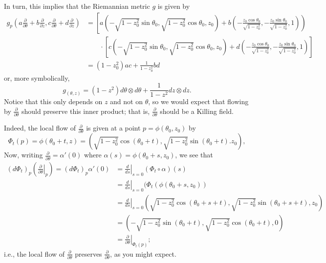 \begin{example}
	In turn, this implies that the Riemannian metric $g$ is given by
	\begin{align*}
		g_p\left(a \frac{\partial}{\partial \theta} + b \frac{\partial}{\partial z}, c \frac{\partial}{\partial \theta} + d \frac{\partial}{\partial z}\right) & = \left[a\left(-\sqrt{1-z_0^2}\sin\theta_0, \sqrt{1-z_0^2}\cos \theta_0,z_0\right)+ b\left(-\frac{z_0 \cos \theta_0}{\sqrt{1-z_0^2}},-\frac{z_0 \sin \theta_0}{\sqrt{1-z_0^2}},1\right)\right) \\
		& \qquad \cdot \left[c\left(-\sqrt{1-z_0^2}\sin\theta_0, \sqrt{1-z_0^2}\cos \theta_0,z_0\right)+ d\left(-\frac{z_0 \cos \theta_0}{\sqrt{1-z_0^2}},-\frac{z_0 \sin \theta_0}{\sqrt{1-z_0^2}},1\right)\right]  \\
		& = \left(1-z_0^2\right) ac + \frac{1}{1-z_0^2} bd
	\end{align*}
	or, more symbolically,
	\[
		g_{(\theta,z)} = \left(1-z^2\right) d\theta \otimes d\theta + \frac{1}{1-z^2} dz \otimes dz.
	\]
	Notice that this only depends on $z$ and not on $\theta$, so we would expect that flowing by $\frac{\partial}{\partial \theta}$ should preserve this inner product; that is, $\frac{\partial}{\partial \theta}$ should be a Killing field. 
	
	Indeed, the local flow of $\frac{\partial}{\partial \theta}$ is given at a point $p = \phi(\theta_0,z_0)$ by
	\[
		\Phi_t(p) = \phi(\theta_0+t,z) = \left(\sqrt{1-z_0^2}\cos (\theta_0+t), \sqrt{1-z_0^2} \sin (\theta_0+t). z_0\right),
	\]
	Now, writing $\frac{\partial}{\partial \theta} = \alpha'(0)$ where $\alpha(s) = \phi(\theta_0+s,z_0)$, we see that
	\begin{align*}
		(d\Phi_t)_p\left(\left.\frac{\partial}{\partial \theta}\right|_{p}\right) = (d\Phi_t)_p\alpha'(0) & = \left. \frac{d}{ds} \right|_{s=0} (\Phi_t \circ \alpha)(s) \\
		& = \left. \frac{d}{ds} \right|_{s=0} (\Phi_t(\phi(\theta_0+s,z_0)) \\
		& =  \left. \frac{d}{ds} \right|_{s=0} \left(\sqrt{1-z_0^2}\cos (\theta_0+s+t), \sqrt{1-z_0^2} \sin (\theta_0+s+t), z_0\right)  \\
		& = \left(-\sqrt{1-z_0^2}\sin(\theta_0+t),\sqrt{1-z_0^2}\cos(\theta_0+t),0\right) \\
		& = \left. \frac{\partial}{\partial \theta}\right|_{\Phi_t(p)};
	\end{align*}
	i.e., the local flow of $\frac{\partial}{\partial \theta}$ preserves $\frac{\partial}{\partial \theta}$, as you might expect.
	

\end{example}
